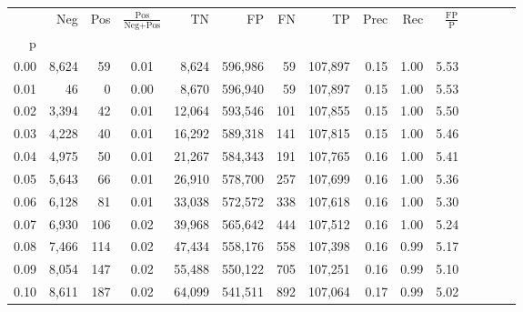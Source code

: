 \begin{tabular}{rrrcrrrrrrrrrrr}
\toprule
{} &     Neg &    Pos & $\frac{\text{Pos}}{\text{Neg}+\text{Pos}}$ &       TN &       FP &       FN &       TP &  Prec &   Rec & $\frac{\text{FP}}{\text{P}}$ \\
p    &         &        &                                            &          &          &          &          &       &       &                              \\
\midrule
0.00 &   8,624 &     59 &                                       0.01 &    8,624 &  596,986 &       59 &  107,897 &  0.15 &  1.00 &                         5.53 \\
0.01 &      46 &      0 &                                       0.00 &    8,670 &  596,940 &       59 &  107,897 &  0.15 &  1.00 &                         5.53 \\
0.02 &   3,394 &     42 &                                       0.01 &   12,064 &  593,546 &      101 &  107,855 &  0.15 &  1.00 &                         5.50 \\
0.03 &   4,228 &     40 &                                       0.01 &   16,292 &  589,318 &      141 &  107,815 &  0.15 &  1.00 &                         5.46 \\
0.04 &   4,975 &     50 &                                       0.01 &   21,267 &  584,343 &      191 &  107,765 &  0.16 &  1.00 &                         5.41 \\
0.05 &   5,643 &     66 &                                       0.01 &   26,910 &  578,700 &      257 &  107,699 &  0.16 &  1.00 &                         5.36 \\
0.06 &   6,128 &     81 &                                       0.01 &   33,038 &  572,572 &      338 &  107,618 &  0.16 &  1.00 &                         5.30 \\
0.07 &   6,930 &    106 &                                       0.02 &   39,968 &  565,642 &      444 &  107,512 &  0.16 &  1.00 &                         5.24 \\
0.08 &   7,466 &    114 &                                       0.02 &   47,434 &  558,176 &      558 &  107,398 &  0.16 &  0.99 &                         5.17 \\
0.09 &   8,054 &    147 &                                       0.02 &   55,488 &  550,122 &      705 &  107,251 &  0.16 &  0.99 &                         5.10 \\
0.10 &   8,611 &    187 &                                       0.02 &   64,099 &  541,511 &      892 &  107,064 &  0.17 &  0.99 &                         5.02 \\

\end{tabular}
